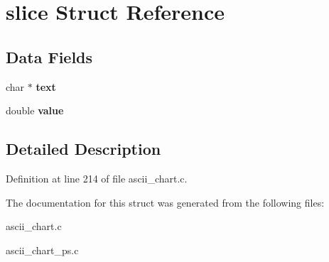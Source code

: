 \hypertarget{structslice}{}\section{slice Struct Reference}
\label{structslice}
\subsection*{Data Fields}
\begin{DoxyCompactItemize}
\item 
\mbox{\label{structslice_ad9d114e9a70bbba4df5637d9fe91af21}} 
char $\ast$ {\bfseries text}
\item 
\mbox{\label{structslice_a82d7890eda71b3697130c625083031fc}} 
double {\bfseries value}
\end{DoxyCompactItemize}


\subsection{Detailed Description}


Definition at line 214 of file ascii\+\_\+chart.\+c.



The documentation for this struct was generated from the following files\+:\begin{DoxyCompactItemize}
\item 
ascii\+\_\+chart.\+c\item 
ascii\+\_\+chart\+\_\+ps.\+c\end{DoxyCompactItemize}
